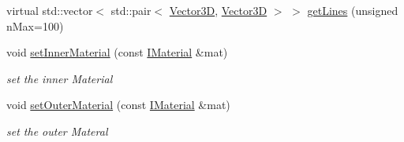 \begin{DoxyCompactItemize}
virtual std::vector$<$ std::pair$<$ \hyperlink{class_d_d_surfaces_1_1_vector3_d}{Vector3D}, \hyperlink{class_d_d_surfaces_1_1_vector3_d}{Vector3D} $>$ $>$ \hyperlink{class_d_d4hep_1_1_d_d_rec_1_1_vol_surface_base_ad0863cf8ceb6a443a048fe89cdc79f26}{getLines} (unsigned nMax=100)
\item 
void \hyperlink{class_d_d4hep_1_1_d_d_rec_1_1_vol_surface_base_aa886f2e4301c3093eddbcd6c07ca7f0a}{setInnerMaterial} (const \hyperlink{class_d_d_surfaces_1_1_i_material}{IMaterial} \&mat)
\begin{DoxyCompactList}\small\item\em set the inner Material \item\end{DoxyCompactList}\item 
void \hyperlink{class_d_d4hep_1_1_d_d_rec_1_1_vol_surface_base_aa06c021dd2374985054c08648100b45a}{setOuterMaterial} (const \hyperlink{class_d_d_surfaces_1_1_i_material}{IMaterial} \&mat)
\begin{DoxyCompactList}\small\item\em set the outer Materal \item\end{DoxyCompactList}\end{DoxyCompactItemize}
